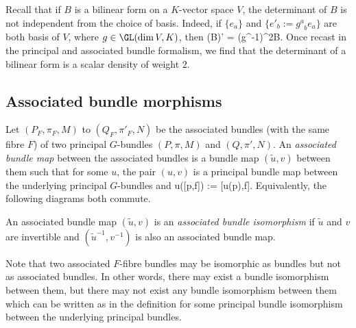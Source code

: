 \be
Recall that if $B$ is a bilinear form on a $K$-vector space $V$, the determinant of $B$ is not independent from the choice of basis. Indeed, if $\{e_a\}$ and $\{e'_b:=g^a_{\phantom{a}b}e_a\}$ are both basis of $V$, where $g\in \GL(\dim V,K)$, then
\bse
(\det B)' = (\det g^{-1})^2\det B.
\ese
Once recast in the principal and associated bundle formalism, we find that the determinant of a bilinear form is a scalar density of weight $2$.
\ee

\subsection{Associated bundle morphisms}

\bd
Let $(P_F,\pi_F,M)$ to $(Q_F,\pi'_F,N)$ be the associated bundles (with the same fibre $F$) of two principal $G$-bundles $(P,\pi,M)$ and $(Q,\pi',N)$. An \emph{associated bundle map} between the associated bundles is a bundle map $(\widetilde u,v)$ between them such that for some $u$, the pair $(u,v)$ is a principal bundle map between the underlying principal $G$-bundles and  
\bse
\widetilde u([p,f]) := [u(p),f].
\ese
Equivalently, the following diagrams both commute.
\bse
{}
\qquad \quad
{}
\ese
\ed

\bd
An associated bundle map $(\widetilde u,v)$ is an \emph{associated bundle isomorphism} if $\widetilde u$ and $v$ are invertible and $(\widetilde u^{-1},v^{-1})$ is also an associated bundle map.
\ed

\br
Note that two associated $F$-fibre bundles may be isomorphic as bundles but not as associated bundles. In other words, there may exist a bundle isomorphism between them, but there may not exist any bundle isomorphism between them which can be written as in the definition for some principal bundle isomorphism between the underlying principal bundles. 
\er


